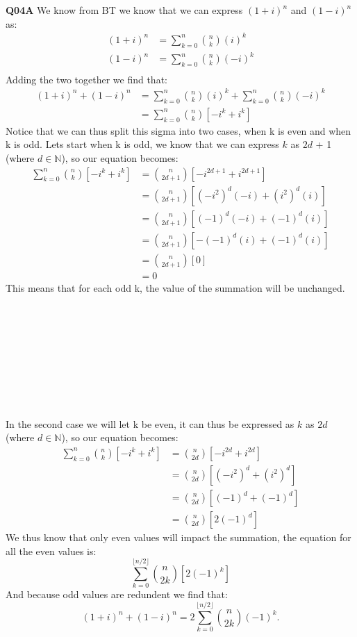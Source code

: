 \documentclass[11pt]{article}
\begin{document}
\parindent=0pt

\textbf{Q04A} We know from BT we know that we can express $(1+i)^n$ and $(1-i)^n$ as:
\begin{align*}
 (1+i)^n & = \sum\limits_{k = 0}^n\binom{n}{k}(i)^k \\
 (1-i)^n & = \sum\limits_{k = 0}^n\binom{n}{k}(-i)^k \\
\end{align*}
Adding the two together we find that:
\begin{align*}
 (1+i)^n +  (1-i)^n & = \sum\limits_{k = 0}^n\binom{n}{k}(i)^k + \sum\limits_{k = 0}^n\binom{n}{k}(-i)^k\\
 & = \sum\limits_{k = 0}^n\binom{n}{k}[-i^k+i^k] 
\end{align*}
Notice that we can thus split this sigma into two cases, when k is even and when k is odd. Lets start when k is odd, we know that we can express $k$ as $2d$ + 1 (where $d \in \mathbb N$), so our equation becomes:
\begin{align*}
\sum\limits_{k = 0}^n\binom{n}{k}[-i^k+i^k] & = \binom{n}{2d+1}[-i^{2d+1}+i^{2d+1}]  \\
 & = \binom{n}{2d+1}[(-i^2)^d(-i) + (i^{2})^d(i)]  \\
 & = \binom{n}{2d+1}[(-1)^d(-i) + (-1)^d(i)]  \\
 & = \binom{n}{2d+1}[-(-1)^d(i) + (-1)^d(i)]  \\
 & = \binom{n}{2d+1}[0]  \\
 & = 0
\end{align*}
This means that for each odd k, the value of the summation will be unchanged. \\\\\\\\\\\\\\\\\\\\

In the second case we will let k be even, it can thus be expressed as  $k$ as $2d$ (where $d \in \mathbb N$), so our equation becomes:
\begin{align*}
\sum\limits_{k = 0}^n\binom{n}{k}[-i^k+i^k] & = \binom{n}{2d}[-i^{2d}+i^{2d}]  \\
 & = \binom{n}{2d}[(-i^2)^d + (i^{2})^d]  \\
 & = \binom{n}{2d}[(-1)^d + (-1)^d]  \\
 & = \binom{n}{2d}[2(-1)^d] 
\end{align*}
We thus know that only even values will impact the summation, the equation for all the even values is:
\[ \sum\limits_{k = 0}^{\lfloor n/2\rfloor} \binom{n}{2k}[2(-1)^k] \]
And because odd values are redundent we find that:
\[ (1 + i)^n + (1 - i)^n = 2\sum\limits_{k = 0}^{\lfloor n/2\rfloor} \binom{n}{2k}(-1)^k. \]
\end{document}
